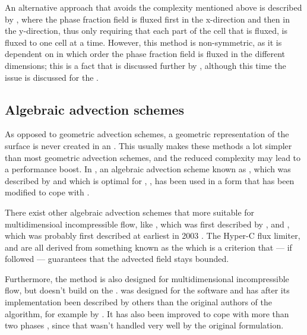 An alternative approach that avoids the complexity mentioned above is described by \citet{Aulisa2003}, where the phase fraction field is fluxed first in the x-direction and then in the y-direction, thus only requiring that each part of the cell that is fluxed, is fluxed to one cell at a time. However, this method is non-symmetric, as it is dependent on in which order the phase fraction field is fluxed in the different dimensions; this is a fact that is discussed further by \citet{Ubbink1999}, although this time the issue is discussed for the  \CICSAM.

\subsection{Algebraic advection schemes}

As opposed to geometric advection schemes, a geometric representation of the surface is never created in an . This usually makes these methods a lot simpler than most geometric advection schemes, and the reduced complexity may lead to a performance boost. In \thisprojectwork, an algebraic advection scheme known as , which was described by \citet{Leonard1988} and which is optimal for , , has been used in a form that has been modified to cope with .

There exist other algebraic advection schemes that more suitable for multidimensioal incompressible flow, like \CICSAM, which was first described by \citet{Ubbink1999}, and \STACS, which was probably first described at earliest in 2003 \citep{Darwish}. The Hyper-C flux limiter, \CICSAM and \STACS are all derived from something known as the \CBC which is a criterion that --- if followed --- guarantees that the advected field stays bounded.

Furthermore, the \MULES method is also designed for multidimensional incompressible flow, but doesn't build on the \CBC. \MULES was designed for the  software  and has after its implementation been described by others than the original authors of the algorithm, for example by \citet{Berberovi2009}. It has also been improved to cope with more than two phases \citep{Kissling2010}, since that wasn't handled very well by the original formulation.


